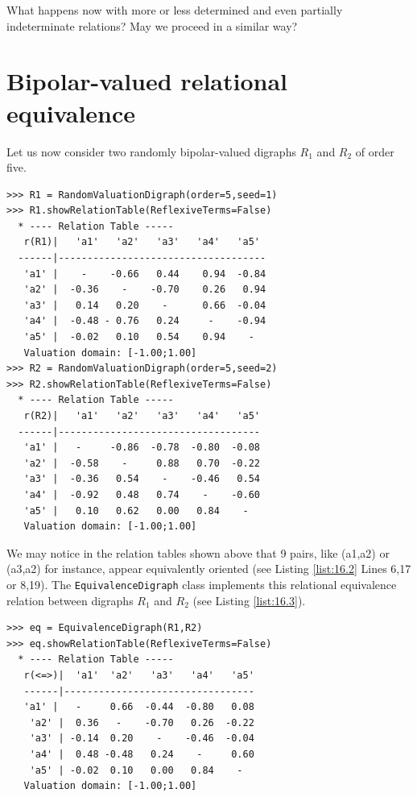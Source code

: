 What happens now with more or less determined and even partially indeterminate relations? May we proceed in a similar way?

\section{Bipolar-valued relational equivalence}
\label{sec:17.2}

Let us now consider two randomly bipolar-valued digraphs $R_1$ and $R_2$ of order five.

\begin{lstlisting}[caption={Two random bipolar-valued digraphs},label=list:16.2]
>>> R1 = RandomValuationDigraph(order=5,seed=1)
>>> R1.showRelationTable(ReflexiveTerms=False)
  * ---- Relation Table -----
   r(R1)|   'a1'   'a2'   'a3'   'a4'   'a5'	  
  ------|------------------------------------
   'a1' |    - 	  -0.66	  0.44	  0.94	-0.84	 
   'a2' |  -0.36    - 	 -0.70	  0.26	 0.94	 
   'a3' |   0.14   0.20	   - 	  0.66	-0.04	 
   'a4' |  -0.48 - 0.76	  0.24	   -  	-0.94	 
   'a5' |  -0.02   0.10	  0.54	  0.94    - 	 
   Valuation domain: [-1.00;1.00]
>>> R2 = RandomValuationDigraph(order=5,seed=2)
>>> R2.showRelationTable(ReflexiveTerms=False)
  * ---- Relation Table -----
   r(R2)|   'a1'   'a2'   'a3'   'a4'   'a5'	  
  ------|-----------------------------------
   'a1' |   -     -0.86  -0.78  -0.80  -0.08	 
   'a2' |  -0.58    -     0.88   0.70  -0.22	 
   'a3' |  -0.36   0.54	   -    -0.46   0.54	 
   'a4' |  -0.92   0.48   0.74    -    -0.60	 
   'a5' |   0.10   0.62   0.00   0.84    - 	 
   Valuation domain: [-1.00;1.00]
\end{lstlisting}

We may notice in the relation tables shown above that 9 pairs, like (a1,a2) or (a3,a2) for instance, appear equivalently oriented (see Listing \ref{list:16.2} Lines 6,17 or 8,19). The \texttt{EquivalenceDigraph} class implements this relational equivalence relation between digraphs $R_1$ and $R_2$ (see Listing \ref{list:16.3}).
\begin{lstlisting}[caption={Bipolar-valued Equivalence Digraph},label=list:16.3]
>>> eq = EquivalenceDigraph(R1,R2)
>>> eq.showRelationTable(ReflexiveTerms=False)
  * ---- Relation Table -----
   r(<=>)|  'a1'  'a2'   'a3'   'a4'   'a5'	  
   ------|---------------------------------
   'a1' |   - 	  0.66  -0.44  -0.80   0.08	 
    'a2' |  0.36   -    -0.70   0.26  -0.22	 
    'a3' | -0.14  0.20    -    -0.46  -0.04	 
    'a4' |  0.48 -0.48   0.24    -     0.60	 
    'a5' | -0.02  0.10   0.00   0.84    - 	 
   Valuation domain: [-1.00;1.00]
\end{lstlisting}

